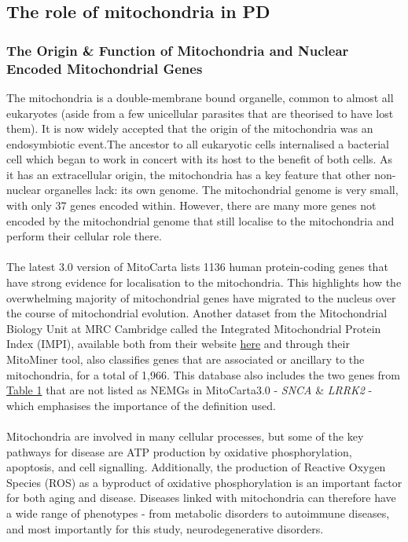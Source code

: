 \documentclass{article}
\begin{document}
\subsection{The role of mitochondria in PD}
\label{subsec:mitochondria}
\subsubsection{The Origin \& Function of Mitochondria and Nuclear Encoded Mitochondrial Genes}
The mitochondria is a double-membrane bound organelle, common to almost all eukaryotes (aside from a few unicellular parasites that are theorised to have lost them\cite{Karnkowska2016AOrganelle}). It is now widely accepted that the origin of the mitochondria was an endosymbiotic event\cite{Martin2015EndosymbioticOrigin.}.The ancestor to all eukaryotic cells internalised a bacterial cell which began to work in concert with its host to the benefit of both cells. As it has an extracellular origin, the mitochondria has a key feature that other non-nuclear organelles lack: its own genome. The mitochondrial genome is very small, with only 37 genes encoded within\cite{Taanman1999TheReplication}. However, there are many more genes not encoded by the mitochondrial genome that still localise to the mitochondria and perform their cellular role there.
\\
\\The latest 3.0 version of MitoCarta \cite{Rath2021MitoCarta3.0:Annotations} lists 1136 human protein-coding genes that have strong evidence for localisation to the mitochondria. This highlights how the overwhelming majority of mitochondrial genes have migrated to the nucleus over the course of mitochondrial evolution. Another dataset from the Mitochondrial Biology Unit at MRC Cambridge called the Integrated Mitochondrial Protein Index (IMPI), available both from their website \href{https://www.mrc-mbu.cam.ac.uk/research-resources-and-facilities/impi}{here} and through their MitoMiner tool\cite{Smith2016MitoMinerDatabase}, also classifies genes that are associated or ancillary to the mitochondria, for a total of 1,966. This database also includes the two genes from \hyperref[tab:fPDgenes]{Table 1} that are not listed as NEMGs in MitoCarta3.0 - \textit{SNCA} \& \textit{LRRK2} - which emphasises the importance of the definition used.
\\
\\Mitochondria are involved in many cellular processes, but some of the key pathways for disease are ATP production by oxidative phosphorylation, apoptosis, and cell signalling\cite{Rossmann2021MitochondrialDisease}. Additionally, the production of Reactive Oxygen Species (ROS) as a byproduct of oxidative phosphorylation is an important factor for both aging and disease\cite{Brieger2012ReactiveDisease}. Diseases linked with mitochondria can therefore have a wide range of phenotypes - from metabolic disorders\cite{Bhatti2017MitochondrialStrategies} to autoimmune diseases\cite{Xu2020EmergingDiseases}, and most importantly for this study, neurodegenerative disorders\cite{MonzioCompagnoni2020TheDisease}.
\end{document}
